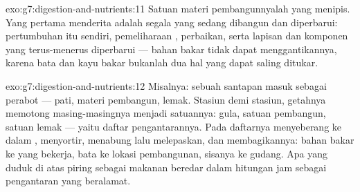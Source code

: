 \begin{solution}{exo:g7:digestion-and-nutrients:11}
Satuan materi pembangunnyalah yang menipis. Yang pertama menderita
adalah segala yang sedang dibangun dan diperbarui: pertumbuhan itu
sendiri, pemeliharaan , perbaikan, serta lapisan dan komponen
 yang terus-menerus diperbarui ---  bahan bakar tidak
dapat menggantikannya, karena bata dan kayu bakar bukanlah dua hal
yang dapat saling ditukar.
\end{solution}

\begin{solution}{exo:g7:digestion-and-nutrients:12}
Misalnya: sebuah santapan masuk sebagai perabot --- pati, materi
pembangun, lemak. Stasiun demi stasiun, getahnya memotong
masing-masingnya menjadi satuannya: gula, satuan pembangun, satuan
lemak --- yaitu daftar pengantarannya. Pada  daftarnya
menyeberang ke dalam ,  menyortir, menabung lalu
melepaskan, dan  membagikannya: bahan bakar ke  yang
bekerja, bata ke lokasi pembangunan, sisanya ke gudang. Apa yang
duduk di atas piring sebagai makanan beredar dalam hitungan jam
sebagai pengantaran yang beralamat.
\end{solution}

